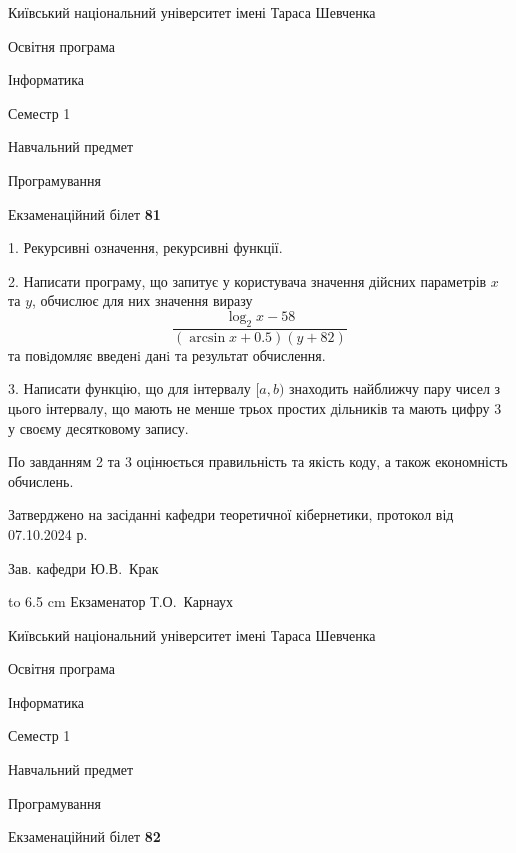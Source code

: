 \documentclass[12pt, ukrainian]{article}
\begin{document}
{{\begin {scriptsize}\par
{ \center  Київський національний університет імені Тараса Шевченка \par}
{\parbox {5 cm}{Освітня програма \hfill}{\parbox {7 cm}{Інформатика\hfill}}\parbox {6 cm}{\hfill Семестр 1}}\par
{\parbox {5 cm} {Навчальний предмет \hfill}\parbox {7 cm}{Програмування \hfill}\parbox {6cm}{\hfill}\par}\vspace{-15pt} \end{scriptsize}}{\center Екзаменаційний білет \No \textbf { 81 }\par}}
{%
1. Рекурсивні означення, рекурсивні функції.%
\par
2. Написати програму, що запитує у користувача значення дійсних параметрів $x$ та $y$, обчислює для них значення виразу 
$$\frac{\log_{2} x - 58}{(\arcsin x + 0.5) (y + 82)}$$ 
та повiдомляє введенi данi та результат обчислення.

\par
3. Написати функцію, що для інтервалу $[a, b)$ знаходить найближчу пару чисел з цього інтервалу, що мають не менше трьох простих дільників та мають цифру 3 у своєму десятковому запису.

По завданням 2 та 3 оцінюється правильність та якість коду, а також економність обчислень.

}
{\smallskip\smallskip \begin {scriptsize} Затверджено на засіданні кафедри теоретичної кібернетики, протокол   від   07.10.2024 р.\par\smallskip\smallskip\smallskip\smallskip
{\parbox {6.5 cm} {Зав. кафедри \dotfill Ю.В.~Крак}}\hspace {0.7cm} {\hbox to 6.5 cm { Екзаменатор \dotfill Т.О.~Карнаух}} \end{scriptsize}}
\newpage
{{\begin {scriptsize}\par
{ \center  Київський національний університет імені Тараса Шевченка \par}
{\parbox {5 cm}{Освітня програма \hfill}{\parbox {7 cm}{Інформатика\hfill}}\parbox {6 cm}{\hfill Семестр 1}}\par
{\parbox {5 cm} {Навчальний предмет \hfill}\parbox {7 cm}{Програмування \hfill}\parbox {6cm}{\hfill}\par}\vspace{-15pt} \end{scriptsize}}{\center Екзаменаційний білет \No \textbf { 82 }\par}}
\end{document}
